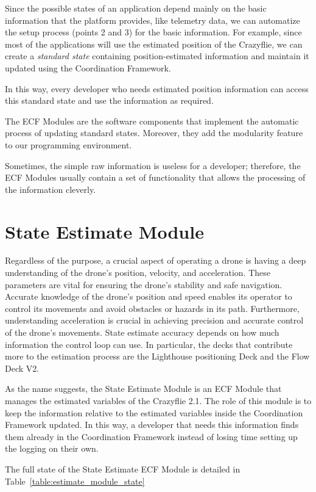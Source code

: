 Since the possible states of an application depend mainly on the basic information that the platform provides, like telemetry data, we can automatize the setup process (points 2 and 3) for the basic information.
For example, since most of the applications will use the estimated position of the Crazyflie, we can create a \textit{standard state} containing position-estimated information and maintain it updated using the Coordination Framework.

In this way, every developer who needs estimated position information can access this standard state and use the information as required.

The ECF Modules are the software components that implement the automatic process of updating standard states. Moreover, they add the modularity feature to our programming environment.

Sometimes, the simple raw information is useless for a developer; therefore, the ECF Modules usually contain a set of functionality that allows the processing of the information cleverly. 


\section{State Estimate Module}\label{sec:module_state_estimate}
Regardless of the purpose, a crucial aspect of operating a drone is having a deep understanding of the drone's position, velocity, and acceleration. 
These parameters are vital for ensuring the drone's stability and safe navigation. 
Accurate knowledge of the drone's position and speed enables its operator to control its movements and avoid obstacles or hazards in its path. 
Furthermore, understanding acceleration is crucial in achieving precision and accurate control of the drone's movements.
State estimate accuracy depends on how much information the control loop can use. 
In particular, the decks that contribute more to the estimation process are the Lighthouse positioning Deck and the Flow Deck V2. 

As the name suggests, the State Estimate Module is an ECF Module that manages the estimated variables of the Crazyflie 2.1.
The role of this module is to keep the information relative to the estimated variables inside the Coordination Framework updated.
In this way, a developer that needs this information finds them already in the Coordination Framework instead of losing time setting up the logging on their own.

The full state of the State Estimate ECF Module is detailed in Table~\ref{table:estimate_module_state}

